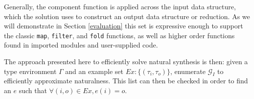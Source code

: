 

Generally, the component function is applied across the \textsf{input} data structure, which the \textsf{solution} uses to construct an \textsf{output} data structure or reduction.
As we will demonstrate in Section \ref{evaluation} this set is expressive enough to support the classic \texttt{map}, \texttt{filter}, and \texttt{fold} functions, as well as higher order functions found in imported modules and user-supplied code.

The approach presented here to efficiently solve natural synthesis is then: given a type environment $\Gamma$ and an example set $Ex:\{(\tau_i,\tau_o)\}$, enumerate $\mathcal{G}_I$ to efficiently approximate naturalness.
This list can then be checked in order to find an $e$ such that $\forall (i,o) \in Ex, e (i) = o$.
